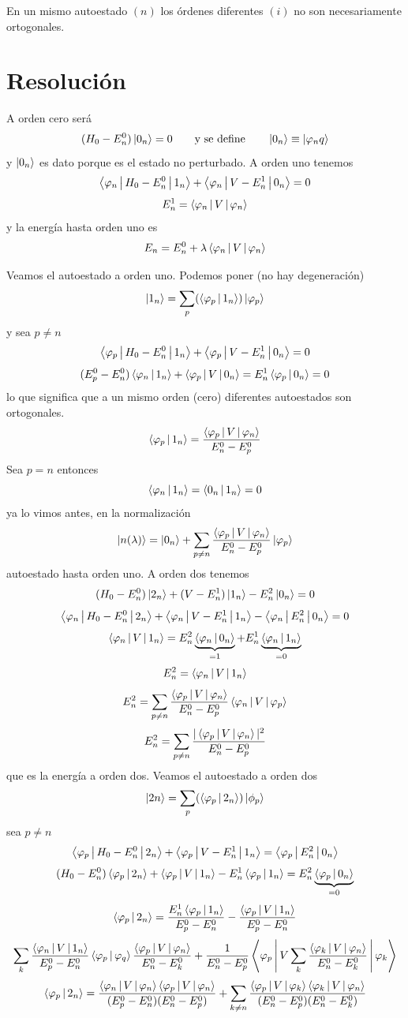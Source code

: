 \documentclass[10pt,oneside]{CBFT_book}
\begin{document}
En un mismo autoestado $(n)$ los órdenes diferentes $(i)$ no son necesariamente ortogonales.

\section{Resolución}

A orden cero será 
\[
	(H_0 - E_n^0) \Ket{0_n} = 0 \qquad \text{y se define} \qquad \Ket{0_n} \equiv \Ket{\varphi_nq} 
\]
y $\Ket{0_n}$ es dato porque es el estado no perturbado.
A orden uno tenemos 
\[
	\Braket{\varphi_n | H_0 - E_n^0 | 1_n } +  \Braket{\varphi_n | V - E_n^1 | 0_n } = 0
\]
\[
	E_n^1 = \Braket{\varphi_n |V| \varphi_n }
\]
y la energía hasta orden uno es 
\[
	E_n = E_n^0 + \lambda \Braket{\varphi_n |V| \varphi_n }
\]

Veamos el autoestado a orden uno. Podemos poner (no hay degeneración)
\[
	\Ket{1_n} = \sum_p (\Braket{\varphi_p|1_n})\Ket{\varphi_p}
\]
y sea $p\neq n$
\[
	\Braket{\varphi_p | H_0 - E_n^0 | 1_n } +  \Braket{\varphi_p | V - E_n^1 | 0_n } = 0
\]
\[
	(E_p^0 - E_n^0)\Braket{\varphi_n | 1_n } +  \Braket{\varphi_p| V | 0_n } = 
	E_n^1 \Braket{\varphi_p | 0_n } = 0
\]
lo que significa que a un mismo orden (cero) diferentes autoestados son ortogonales.
\[
	\Braket{\varphi_p|1_n} = \frac{\Braket{\varphi_p|V|\varphi_n}}{E_n^0 - E_p^0}
\]
Sea $p=n$ entonces 
\[
	\Braket{\varphi_n|1_n} = \Braket{0_n|1_n} = 0 
\]
ya lo vimos antes, en la normalización
\[
	\Ket{n(\lambda)} = \Ket{0_n} + \sum_{p\neq n} \frac{\Braket{\varphi_p|V|\varphi_n}}{E_n^0 - E_p^0} \Ket{\varphi_p}
\]
autoestado hasta orden uno. A orden dos tenemos 
\[
	(H_0 - E_n^0)\Ket{2_n} + (V - E_n^1)\Ket{1_n}- E_n^2\Ket{0_n} = 0
\]
\[
	\Braket{\varphi_n|H_0 - E_n^0|2_n } + \Braket{\varphi_n|V - E_n^1|1_n}- 
	\Braket{\varphi_n|E_n^2|0_n} = 0
\]
\[
	\Braket{\varphi_n|V|1_n} = 
	 E_n^2\underbrace{\Braket{\varphi_n|0_n}}_{=1} + E_n^1\underbrace{\Braket{\varphi_n|1_n}}_{=0}
\]
\[
	E_n^2 = \Braket{\varphi_n|V|1_n}
\]
\[
	E_n^2 = \sum_{p\neq n} \frac{\Braket{\varphi_p|V|\varphi_n}}{E_n^0 - E_p^0} \Braket{\varphi_n|V|\varphi_p}
\]
\[
	E_n^2 = \sum_{p\neq n} \frac{|\Braket{\varphi_p|V|\varphi_n}|^2}{E_n^0 - E_p^0} 
\]
que es la energía a orden dos.
Veamos el autoestado a orden dos 
\[
	\Ket{2n} = \sum_p (\Braket{\varphi_p|2_n})\Ket{\phi_p}
\]
sea $p\neq n$ 
\[
	\Braket{\varphi_p|H_0 - E_n^0|2_n } + \Braket{\varphi_p|V - E_n^1|1_n} = 
	\Braket{\varphi_p|E_n^2|0_n}
\]
\[
	(H_0 - E_n^0)\Braket{\varphi_p|2_n } + \Braket{\varphi_p|V|1_n} -
	E_n^1\Braket{\varphi_p|1_n} = E_n^2\underbrace{\Braket{\varphi_p|0_n}}_{=0}
\]
\[
	\Braket{\varphi_p|2_n } = \frac{E_n^1\Braket{\varphi_p|1_n}}{E_p^0 - E_n^0} - 
	\frac{\Braket{\varphi_p|V|1_n}}{E_p^0 - E_n^0}
\]
\[
	\sum_k \frac{\Braket{\varphi_n|V|1_n}}{E_p^0 - E_n^0}\Braket{\varphi_p|\varphi_q}
	\frac{\Braket{\varphi_p|V|\varphi_n}}{E_n^0 - E_k^0} + \frac{1}{E_n^0 - E_p^0}
	\Braket{\varphi_p|V\sum_k \frac{\Braket{\varphi_k|V|\varphi_n}}{E_n^0 - E_k^0} |\varphi_k}
\]
\[
	\Braket{\varphi_p|2_n} = \frac{\Braket{\varphi_n|V|\varphi_n}\Braket{\varphi_p|V|\varphi_n}}
		{(E_p^0 - E_n^0)(E_n^0 - E_p^0)} + \sum_{k\neq n} 
		\frac{\Braket{\varphi_p|V|\varphi_k}\Braket{\varphi_k|V|\varphi_n}}
		{(E_n^0 - E_p^0)(E_n^0 - E_k^0)}
\]
\end{document}

